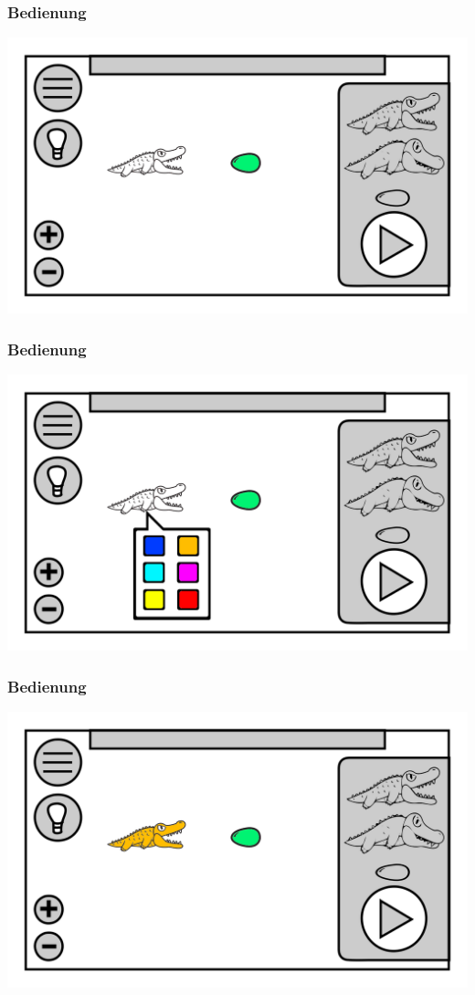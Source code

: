 \documentclass[t]{beamer}
\begin{document}
\begin{frame}
	\frametitle{Bedienung}
	\includegraphics[height=\textheight]{level_croc.png}
\end{frame}
\begin{frame}
	\frametitle{Bedienung}
	\includegraphics[height=\textheight]{level_color_purple.png}
\end{frame}
\begin{frame}
	\frametitle{Bedienung}
	\includegraphics[height=\textheight]{level_colored_croc.png}
\end{frame}
\end{document}

